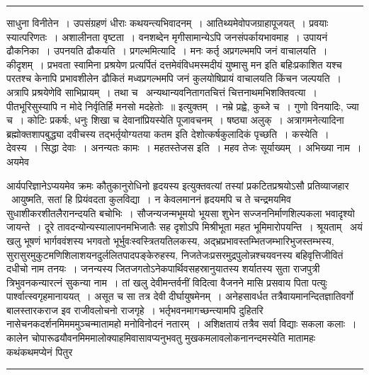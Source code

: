 \documentclass[11pt, openany]{book}
\begin{document}
\vspace{2mm}
\hrule

\noindent
{\s साधुना विनीतेन~। {\qt उपसंग्रहणं धीराः कथयन्त्यभिवादनम्}~। आतिथ्यमेवोपजग्राहापूजयत्~। {\qt प्रवयाः स्यात्परिणतः}~। अशालीनता वृष्टता~। वनशब्देन मृगीसामान्येऽपि जनसंपर्कायभावमाह~। उपायनं ढौकनिका~। उपनयति ढौकयति~। {\qtt प्रगल्भमित्यादि}~। मनः कर्तृ अप्रगल्भमपि जनं वाचालयति~। कीदृशम्~। प्रभवता स्वामिना प्रश्रयेण प्रत्यर्पितं दत्तमेवंविधमस्मदीयं युष्मासु मन इति बहिःप्रकाशित यश्च परतश्च केनापि प्रभावशीलेन ढौकितं मध्वप्रगल्भमपि जनं कुलयोषिप्रायं वाचालयति किंचन जल्पयति~। अत्रापि प्रश्रयेणेवि साभिप्रायम्~। तथा च \textendash\ {\qt अन्यथान्यवनितागतचित्तं चित्तनाथमभिशक्तिवत्या~। पीतभूरिसुस्यापि न मोदे निर्वृतिर्हि मनसो मदहेतोः~॥} इत्युक्तम्~। नम्रे प्रह्वे, कुब्जे च~। गुणो विनयादिः, ज्या च~। कोटिः प्रकर्षः, धनुः शिखा च देवानांप्रियस्येति पूजावचनम्~। षष्ठ्या अलुक्~। अत्रागमनेत्यादिना ब्रह्मोक्तशापबुद्ध्या दवीचस्य तद्भर्तृयोग्यतया कतम इति देशोत्कर्षकुलादिकं पृच्छति~। {\qtt कस्येति}~। देवस्य~। सिद्धा देवाः~। अनन्यतः कामः~। {\qtt महतस्तेजस इति}~। महव तेजः सूर्याख्यम्~। अभिख्या नाम~। {\qtt अयमेव}}

\newpage

\noindent
आर्यपरिज्ञानेऽप्ययमेव क्रमः कौतुकानुरोधिनो हृदयस्य इत्युक्तवत्यां तस्यां प्रकटितप्रश्रयोऽसौ प्रतिव्याजहार \textendash\ आयुष्मति, सतां हि प्रियंवदता कुलविद्या~। न केवलमाननं हृदयमपि च ते चन्द्रमयमिव सुधाशीकरशीतलैरानन्दयति बचोभिः~। सौजन्यजन्मभूमयो भूयसा शुभेन सज्जननिर्माणशिल्पकला भवादृश्यो जायन्ते~। दूरे तावदन्योन्यस्यालापनमभिजातैः सह दृशोऽपि मिश्रीभूता महत भूमिमारोपयन्ति~। श्रूयताम् \textendash\ अयं खलु भूषणं भार्गववंशस्य भगवतो भूर्भुवःस्वस्त्रितयतिलकस्य, अद्भ्रप्रभावस्तम्भितजम्भारिभुजस्तम्भस्य, सुरासुरमुकुटमणिशिलाशयनदुर्ललितपादपङ्केरुहस्य, निजतेजःप्रसरमुद्रपुलोन्नश्चयवनस्य बहिवृत्तिजीवितं दधीचो नाम तनयः~। जनन्यस्य जितजगतोऽनेकपार्थिवसहस्रानुयातस्य शर्यातस्य सुता राजपुत्री त्रिभुवनकन्यारत्नं सुकन्या नाम~। तां खलु देवीमन्तर्वनीं विदित्वा वैजनने मासि प्रसवाय पिता पत्युः पार्श्वात्स्वगृहमानाययत्~। असूत च सा तत्र देवी दीर्घायुषमेनम्~। अनेहसावर्धत तत्रैवायमानन्दितज्ञातिवर्गो बालस्तारकराज इव राजीवलोचनो राजगृहे~। भर्तृभवनमागच्छन्त्यामपि दुहितरि नासेचनकदर्शनमिमममुञ्चन्मातामहो मनोविनोदनं नतारम्~। अशिक्षतायं तत्रैव सर्वा विद्याः सकला कलाः~। कालेन चोपारूढयौवनमिममालोक्याहमिवासावप्यनुभवतु मुखकमलावलोकनानन्दमस्येति मातामहः कथंकथमप्येनं पितुर\textendash

\vspace{2mm}
\hrule
\end{document}
